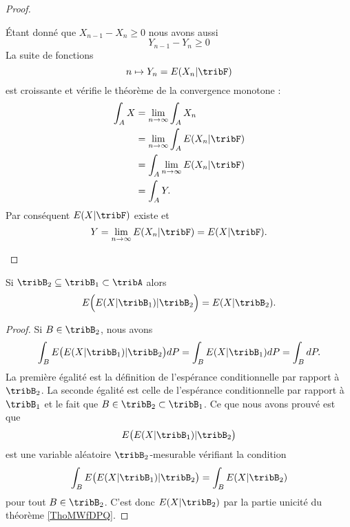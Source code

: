 \begin{proof}
\begin{description}
            Étant donné que \( X_{n-1}-X_n\geq 0\) nous avons aussi
            \begin{equation}
                Y_{n-1}-Y_{n}\geq 0
            \end{equation}
            La suite de fonctions
            \begin{equation}
                n\mapsto Y_n=E(X_n|\tribF)
            \end{equation}
            est croissante et vérifie le théorème de la convergence monotone :
            \begin{subequations}
                \begin{align}
                    \int_A X&=\lim_{n\to \infty} \int_A X_n\\
                    &=\lim_{n\to \infty} \int_A E(X_n|\tribF)\\
                    &=\int_A\lim_{n\to \infty } E(X_n|\tribF)\\
                    &=\int_A Y.
                \end{align}
            \end{subequations}
            Par conséquent \( E(X|\tribF)\) existe et
            \begin{equation}
                Y=\lim_{n\to \infty} E(X_n|\tribF)=E(X|\tribF).
            \end{equation}
    \end{description}
\end{proof}

\begin{proposition}
    Si \( \tribB_2\subseteq\tribB_1\subset\tribA\) alors
    \begin{equation}
        E\Big( E(X|\tribB_1)|\tribB_2 \Big)=E(X|\tribB_2).
    \end{equation}
\end{proposition}

\begin{proof}
    Si \( B\in\tribB_2\), nous avons
    \begin{equation}
        \int_BE\big( E(X|\tribB_1)|\tribB_2 \big)dP=\int_B E(X|\tribB_1)dP=\int_BdP.
    \end{equation}
    La première égalité est la définition de l'espérance conditionnelle par rapport à \( \tribB_2\). La seconde égalité est celle de l'espérance conditionnelle par rapport à \( \tribB_1\) et le fait que \( B\in\tribB_2\subset\tribB_1\). Ce que nous avons prouvé est que
    \begin{equation}
        E\big( E(X|\tribB_1)|\tribB_2 \big)
    \end{equation}
    est une variable aléatoire \( \tribB_2\)-mesurable vérifiant la condition
    \begin{equation}
        \int_BE\big( E(X|\tribB_1)|\tribB_2 \big)=\int_BE(X|\tribB_2)
    \end{equation}
    pour tout \( B\in \tribB_2\). C'est donc \( E(X|\tribB_2)\) par la partie unicité du théorème \ref{ThoMWfDPQ}.
\end{proof}

